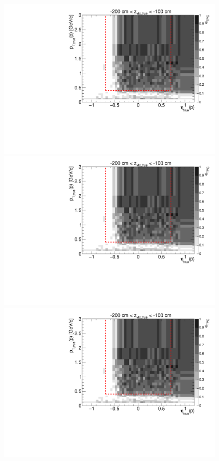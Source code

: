 \begin{figure}[hb]\ContinuedFloat
\centering
\parbox{0.495\textwidth}{
  \centering
  \includegraphics[width=\linewidth,page=11]{graphics/eff/Eff2D_TPC_proton_Minus.pdf}\\
  \includegraphics[width=\linewidth,page=13]{graphics/eff/Eff2D_TPC_proton_Minus.pdf}\\
  \includegraphics[width=\linewidth,page=15]{graphics/eff/Eff2D_TPC_proton_Minus.pdf}\\
}
\end{figure}
